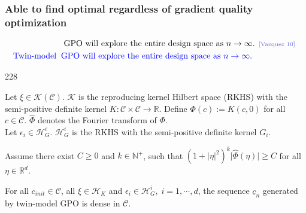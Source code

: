 \documentclass{beamer}
\let\oldcite=\cite
\renewcommand{\cite}[1]{\textcolor[rgb]{.4,.4,.85}{\oldcite{#1}}}
\newcommand{\barrow}{\item[\color{darkred}\ding{228}]}
\begin{document}
\begin{frame}
    \frametitle{\large Able to find optimal regardless of gradient quality \hfill \scriptsize{optimization}}\small
    \begin{equation*}\begin{split}
        &\textrm{
        {GPO will explore the entire design space as $n\rightarrow \infty$.} 
        \scriptsize \cite{Vazquez 10} }\\
        \textrm{\textcolor{blue}{Twin-model}}\;\;
        &\textrm{\textcolor{blue}{GPO will explore the entire design space as $n\rightarrow \infty$.}}
    \end{split}\end{equation*}
    \vspace{.1cm}
    \begin{dinglist}{228}
        \barrow
        Let $\xi\in \mathcal{K}(\mathcal{C})$. $\mathcal{K}$ is the reproducing kernel Hilbert space 
        (RKHS)
        with the semi-positive definite kernel $K: \mathcal{C}\times \mathcal{C}\rightarrow \mathbb{R}$.
        Define $\Phi(c) := K(c, 0)$ for all $c\in \mathcal{C}$. $\hat{\Phi}$ denotes the Fourier 
        transform of $\Phi$.\\
        \vspace{.2cm}
        Let $\epsilon_i\in \mathcal{H}_G^i$. $\mathcal{H}_G^i$ is the RKHS with the semi-positive  
        definite kernel $G_i$.
        \vspace{.3cm}
        \barrow
        Assume there exist $C\ge 0$ and $k \in\mathbb{N}^+$, such that
        $(1+|\eta|^2)^k \big|\hat{\Phi}(\eta)\big|\ge C$ for all $\eta\in \mathbb{R}^d$.\\
        \vspace{.3cm}
        \barrow
        For all $c_{init}\in \mathcal{C}$, all $\xi\in \mathcal{H}_K$ and $\epsilon_i \in
        \mathcal{H}_G^i,\; i=1,\cdots, d$,
        the sequence $\underline{c}_n$ generated by twin-model GPO is dense in $\mathcal{C}$.
    \end{dinglist}
\end{frame}
\end{document}

